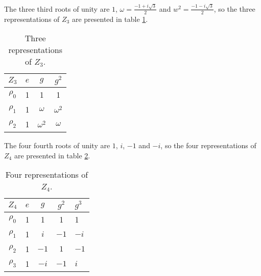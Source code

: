 		\begin{example}
			The three third roots of unity are $1$, $\omega = \frac{-1+i\sqrt{3}}{2}$ and $w^2 = \frac{-1-i\sqrt{3}}{2}$, so the three representations of $Z_3$ are presented in table \ref{table:Z3}.
			
			\begin{table}[hbt!]
				\centering
				\caption{Three representations of $Z_3$.}
				\begin{tabular}{c | c c c}
					\label{table:Z3}
					$Z_3$ & $e$ & $g$        & $g^2$      \\ \hline
					$\rho_0$          & 1   & 1          & 1          \\
					$\rho_1$          & 1   & $\omega$   & $\omega^2$ \\
					$\rho_2$          & 1   & $\omega^2$ & $\omega$
				\end{tabular}
			\end{table}
		\end{example}
		
		\begin{example}
			The four fourth roots of unity are $1$, $i$, $-1$ and $-i$, so the four representations of $Z_4$ are presented in table \ref{table:Z4}.
			
			\begin{table}[hbt!]
				\centering
				\caption{Four representations of $Z_4$.}
				\begin{tabular}{c | c c cl}
					\label{table:Z4}
					$Z_4$ & $e$ & $g$  & $g^2$ & $g^3$ \\ \hline
					         $\rho_0$           & 1   & 1    & 1     & 1     \\
					         $\rho_1$           & 1   & $i$  & $-1$  & $-i$  \\
					         $\rho_2$           & 1   & $-1$ & $1$  & $-1$   \\
					         $\rho_3$           & 1   & $-i$ & $-1$   & $i$
				\end{tabular}
			\end{table}
		\end{example}
		

